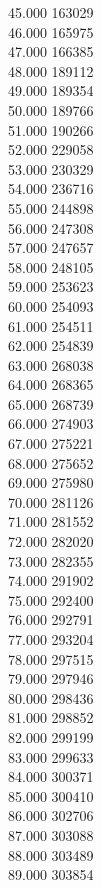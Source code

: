 { 45.000	163029 \\
 46.000	165975 \\
 47.000	166385 \\
 48.000	189112 \\
 49.000	189354 \\
 50.000	189766 \\
 51.000	190266 \\
 52.000	229058 \\
 53.000	230329 \\
 54.000	236716 \\
 55.000	244898 \\
 56.000	247308 \\
 57.000	247657 \\
 58.000	248105 \\
 59.000	253623 \\
 60.000	254093 \\
 61.000	254511 \\
 62.000	254839 \\
 63.000	268038 \\
 64.000	268365 \\
 65.000	268739 \\
 66.000	274903 \\
 67.000	275221 \\
 68.000	275652 \\
 69.000	275980 \\
 70.000	281126 \\
 71.000	281552 \\
 72.000	282020 \\
 73.000	282355 \\
 74.000	291902 \\
 75.000	292400 \\
 76.000	292791 \\
 77.000	293204 \\
 78.000	297515 \\
 79.000	297946 \\
 80.000	298436 \\
 81.000	298852 \\
 82.000	299199 \\
 83.000	299633 \\
 84.000	300371 \\
 85.000	300410 \\
 86.000	302706 \\
 87.000	303088 \\
 88.000	303489 \\
 89.000	303854 \\
}
